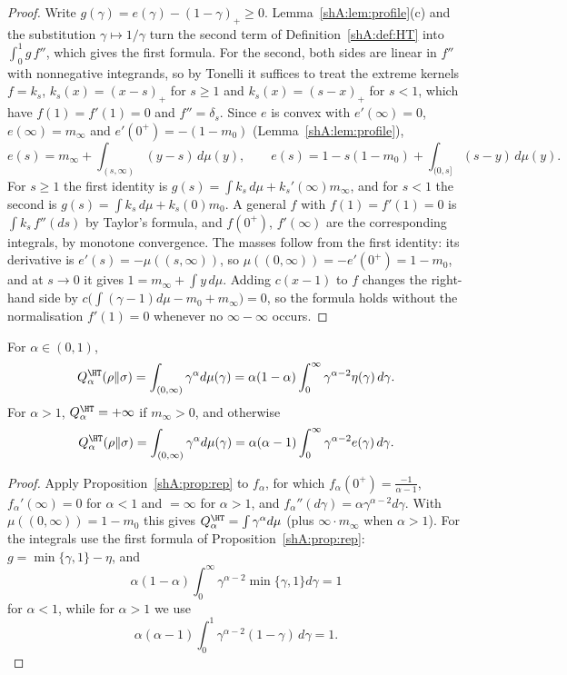 \begin{proof}
Write $g(\gamma)=e(\gamma)-(1-\gamma)_+\ge0$. Lemma~\ref{shA:lem:profile}(c) and the substitution $\gamma\mapsto1/\gamma$ turn the second term of Definition~\ref{shA:def:HT} into $\int_0^1g\,f''$, which gives the first formula. For the second, both sides are linear in $f''$ with nonnegative integrands, so by Tonelli it suffices to treat the extreme kernels $f=k_s$, $k_s(x)=(x-s)_+$ for $s\ge1$ and $k_s(x)=(s-x)_+$ for $s<1$, which have $f(1)=f'(1)=0$ and $f''=\delta_s$. Since $e$ is convex with $e'(\infty)=0$, $e(\infty)=m_\infty$ and $e'(0^+)=-(1-m_0)$ (Lemma~\ref{shA:lem:profile}),
\[
e(s)=m_\infty+\int_{(s,\infty)}(y-s)\,d\mu(y),\qquad e(s)=1-s(1-m_0)+\int_{(0,s]}(s-y)\,d\mu(y).
\]
For $s\ge1$ the first identity is $g(s)=\int k_s\,d\mu+k_s'(\infty)m_\infty$, and for $s<1$ the second is $g(s)=\int k_s\,d\mu+k_s(0)m_0$. A general $f$ with $f(1)=f'(1)=0$ is $\int k_s\,f''(ds)$ by Taylor's formula, and $f(0^+)$, $f'(\infty)$ are the corresponding integrals, by monotone convergence. The masses follow from the first identity: its derivative is $e'(s)=-\mu((s,\infty))$, so $\mu((0,\infty))=-e'(0^+)=1-m_0$, and at $s\to0$ it gives $1=m_\infty+\int y\,d\mu$. Adding $c(x-1)$ to $f$ changes the right-hand side by $c\big(\int(\gamma-1)d\mu-m_0+m_\infty\big)=0$, so the formula holds without the normalisation $f'(1)=0$ whenever no $\infty-\infty$ occurs.
\end{proof}

\begin{proposition}\label{shA:prop:mellin}
For $\alpha\in(0,1)$,
\[
Q^\HT_\alpha(\rho\|\sigma)=\int_{(0,\infty)}\gamma^\alpha d\mu(\gamma)=\alpha(1-\alpha)\int_0^\infty\gamma^{\alpha-2}\eta(\gamma)\,d\gamma .
\]
For $\alpha>1$, $Q^\HT_\alpha=+\infty$ if $m_\infty>0$, and otherwise
\[
Q^\HT_\alpha(\rho\|\sigma)=\int_{(0,\infty)}\gamma^\alpha d\mu(\gamma)=\alpha(\alpha-1)\int_0^\infty\gamma^{\alpha-2}e(\gamma)\,d\gamma .
\]
\end{proposition}

\begin{proof}
Apply Proposition~\ref{shA:prop:rep} to $f_\alpha$, for which $f_\alpha(0^+)=\frac{-1}{\alpha-1}$, $f_\alpha'(\infty)=0$ for $\alpha<1$ and $=\infty$ for $\alpha>1$, and $f_\alpha''(d\gamma)=\alpha\gamma^{\alpha-2}d\gamma$. With $\mu((0,\infty))=1-m_0$ this gives $Q^\HT_\alpha=\int\gamma^\alpha d\mu$ (plus $\infty\cdot m_\infty$ when $\alpha>1$). For the integrals use the first formula of Proposition~\ref{shA:prop:rep}: $g=\min\{\gamma,1\}-\eta$, and
\[
\alpha(1-\alpha)\int_0^\infty\gamma^{\alpha-2}\min\{\gamma,1\}d\gamma=1
\]
for $\alpha<1$, while for $\alpha>1$ we use
\[
\alpha(\alpha-1)\int_0^1\gamma^{\alpha-2}(1-\gamma)\,d\gamma=1.
\]
\end{proof}

